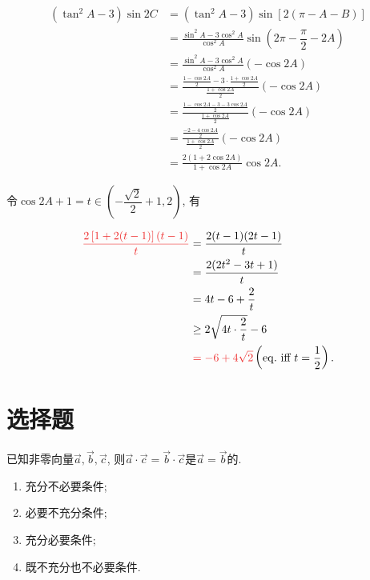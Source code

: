 \documentclass[8pt]{article}
\begin{document}
		\begin{align*}
			\left(\tan^2 A - 3\right)\sin 2C &= \left(\tan^2 A - 3\right) \sin \left[2 \left(\pi - A - B\right)\right] \\
			                                 &= \frac{\sin^2 A - 3\cos^2 A}{\cos^2 A} \sin \left(2\pi - \dfrac{\pi}{2} - 2A\right)\\
			                                 &= \frac{\sin^2 A - 3\cos^2 A}{\cos^2 A} \left(-\cos 2A\right)\\
			                                 &= \frac{\frac{1 - \cos 2A}{2} - 3 \cdot \frac{1 + \cos 2A}{2}}{\frac{1 + \cos 2A}{2}} \left(- \cos 2A\right)\\
			                                 &= \frac{\frac{1 - \cos 2A - 3 - 3 \cos2A}{2}}{\frac{1 + \cos 2A}{2}} \left(-\cos 2A\right)\\
			                                 &= \frac{\frac{-2 - 4 \cos 2A}{2}}{\frac{1 + \cos 2A}{2}} \left(- \cos 2A\right)\\
			                                 &= \frac{2 \left(1 + 2 \cos 2A\right)}{1 + \cos 2A} \cos 2A.
		\end{align*}

		令\(\cos 2A + 1 = t \in \left(-\dfrac{\sqrt{2}}{2} + 1, 2\right)\), 有

		\begin{align*}
			\ansmath{\frac{2\left[1 + 2(t-1) \right] (t-1)}{t}} &= \frac{2 (t-1) (2t-1)}{t}\\
			                                                    &= \frac{2 (2t^2 - 3t + 1)}{t}\\
			                                                    &= 4t - 6 + \frac{2}{t}\\
			                                                    &\geq 2\sqrt{4t \cdot \frac{2}{t}} - 6\\
			                                                    &\ansmath{= -6 + 4\sqrt{2}} \left(\mathrm{eq. }\Iff t = \frac{1}{2}\right).
		\end{align*}

	\section{选择题}
		 已知非零向量\(\vec{a}, \vec{b}, \vec{c}\), 则\(\vec{a} \cdot \vec{c} = \vec{b} \cdot \vec{c}\)是\(\vec{a} = \vec{b}\)的.

		\begin{multicols}{2}
			\begin{enumerate}[label = \calword{\Alph*.}]
				\item 充分不必要条件;
				\item 必要不充分条件;
				\item 充分必要条件;
				\item 既不充分也不必要条件.
			\end{enumerate}
		\end{multicols}
\end{document}
